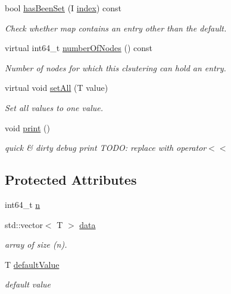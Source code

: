 \begin{DoxyCompactItemize}
bool \hyperlink{class_ensemble_clustering_1_1_index_map_a059e36d3c7900f33daa397b0491dfdb6}{has\-Been\-Set} (I \hyperlink{namespace_ensemble_clustering_a1ba11e6d628873b803a26fe054f45e28}{index}) const 
\begin{DoxyCompactList}\small\item\em Check whether map contains an entry other than the default. \end{DoxyCompactList}\item 
virtual int64\-\_\-t \hyperlink{class_ensemble_clustering_1_1_index_map_a12dd2383d0014aefbc3b496998fa1383}{number\-Of\-Nodes} () const 
\begin{DoxyCompactList}\small\item\em Number of nodes for which this clsutering can hold an entry. \end{DoxyCompactList}\item 
virtual void \hyperlink{class_ensemble_clustering_1_1_index_map_a4e876117022db5f4c0dad88c3dcdfaa6}{set\-All} (T value)
\begin{DoxyCompactList}\small\item\em Set all values to one value. \end{DoxyCompactList}\item 
void \hyperlink{class_ensemble_clustering_1_1_index_map_ac1181a9a7588bf56ab70d4aba94955ec}{print} ()
\begin{DoxyCompactList}\small\item\em quick \& dirty debug print T\-O\-D\-O\-: replace with operator$<$$<$ \end{DoxyCompactList}\end{DoxyCompactItemize}
\subsection*{Protected Attributes}
\begin{DoxyCompactItemize}
\item 
int64\-\_\-t \hyperlink{class_ensemble_clustering_1_1_index_map_a3151d302c54e6ad0175bd87aef62d4ca}{n}
\item 
std\-::vector$<$ T $>$ \hyperlink{class_ensemble_clustering_1_1_index_map_a909f3cec6b55efedddd6aa3675389690}{data}
\begin{DoxyCompactList}\small\item\em array of size (n). \end{DoxyCompactList}\item 
T \hyperlink{class_ensemble_clustering_1_1_index_map_ab5f1dc778237131e9d6c5713c2b318ec}{default\-Value}
\begin{DoxyCompactList}\small\item\em default value \end{DoxyCompactList}\end{DoxyCompactItemize}


